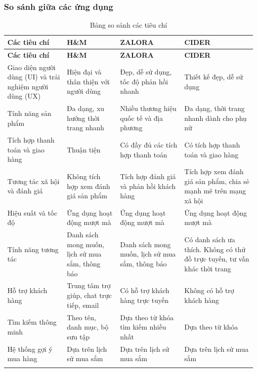 \subsubsection{So sánh giữa các ứng dụng}
\begin{center}
\begin{longtable}{ |p{3cm}|p{3cm}|p{3cm}|p{3cm}| }
\hline
\textbf{Các tiêu chí}  & \textbf{H\&M \cite{HM}} & \textbf{ZALORA \cite{zalora}} & 
\textbf{CIDER \cite{cider}} \\
\hline
\endfirsthead

\hline
\textbf{Các tiêu chí}  & \textbf{H\&M \cite{HM}} & \textbf{ZALORA \cite{zalora}} & 
\textbf{CIDER \cite{cider}} \\
\hline
\endhead

\raggedright Giao diện người dùng (UI) và trải nghiệm người dùng (UX) &  Hiện đại và thân thiện với người dùng & Đẹp, dễ sử dụng, tốc độ phản hồi nhanh & Thiết kế đẹp, dễ sử dụng\\
\hline
\raggedright Tính năng sản phẩm & Đa dạng, xu hướng thời trang nhanh & Nhiều thương hiệu quốc tế và địa phương &Đa dạng, thời trang nhanh dành cho phụ nữ\\
\hline
\raggedright Tích hợp thanh toán và giao hàng & Thuận tiện & Có đầy đủ các tích hợp thanh toán & Có tích hợp thanh toán và giao hàng\\
\hline
\raggedright Tương tác xã hội và đánh giá & Không tích hợp xem đánh giá sản phẩm & Tích hợp đánh giá và phản hồi khách hàng & Tích hợp xem đánh giá sản phẩm, chia sẻ mạnh mẽ trên mạng xã hội\\
\hline
\raggedright Hiệu suất và tốc độ & Ứng dụng hoạt động mượt mà & Ứng dụng hoạt động mượt mà & Ứng dụng hoạt động mượt mà \\
\hline
\raggedright Tính năng tương tác & Danh sách mong muốn, lịch sử mua sắm, thông báo & Danh sách mong muốn, lịch sử mua sắm, thông báo & Có danh sách ưa thích. Không có thử đồ trực tuyến, tư vấn khác thời trang \\
\hline
\raggedright Hỗ trợ khách hàng & Trung tâm trợ giúp, chat trực tiếp, email & Có hỗ trợ khách hàng trực tuyến & Không có hỗ trợ khách hàng\\
\hline
\raggedright Tìm kiếm thông minh & Theo tên, danh mục, bộ sưu tập & Dựa theo từ khóa tìm kiếm nhiều nhất & Dựa theo từ khóa\\
\hline
\raggedright Hệ thống gợi ý mua hàng & Dựa trên lịch sử mua sắm & Dựa trên lịch sử mua sắm & Dựa trên lịch sử mua sắm \\
\hline
\caption{Bảng so sánh các tiêu chí}
\end{longtable}
\end{center}
